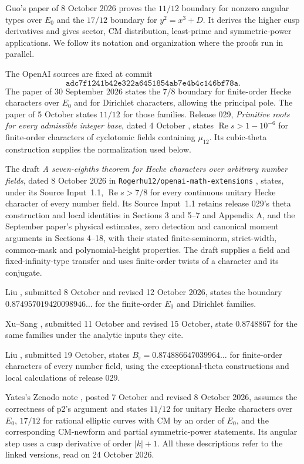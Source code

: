 \documentclass[11pt,a4paper]{article}
\numberwithin{equation}{section}
\theoremstyle{definition}
\theoremstyle{remark}
\newcommand{\Rea}{\operatorname{Re}}
\begin{document}
Guo's paper of 8 October 2026 \cite{GuoEisenstein} proves the $11/12$ boundary for nonzero angular types over $E_0$ and the $17/12$ boundary for $y^2=x^3+D$. It derives the higher cusp derivatives and gives sector, CM distribution, least-prime and symmetric-power applications. We follow its notation and organization where the proofs run in parallel.

The OpenAI sources are fixed at commit
\[
 \texttt{adc7f1241b42e322a6451854ab7e4b4c146bf78a}.
\]
The paper of 30 September 2026 \cite[Theorem 1.1]{QRH78} states the $7/8$ boundary for finite-order Hecke characters over $E_0$ and for Dirichlet characters, allowing the principal pole. The paper of 5 October \cite[Theorem 1.1]{QRH12} states $11/12$ for those families. Release 029, \emph{Primitive roots for every admissible integer base}, dated 4 October \cite[Theorem 1.2]{PrimitiveRoots}, states $\Rea s>1-10^{-6}$ for finite-order characters of cyclotomic fields containing $\mu_{12}$. Its cubic-theta construction supplies the normalization used below.

The draft \emph{A seven-eighths theorem for Hecke characters over arbitrary number fields}, dated 8 October 2026 in \nolinkurl{Rogerhu12/openai-math-extensions} \cite{FollowupSevenEighths}, states, under its Source Input~1.1, $\Rea s>7/8$ for every continuous unitary Hecke character of every number field. Its Source Input~1.1 retains release 029's theta construction and local identities in Sections 3 and 5--7 and Appendix A, and the September paper's physical estimates, zero detection and canonical moment arguments in Sections 4--18, with their stated finite-seminorm, strict-width, common-mask and polynomial-height properties. The draft supplies a field and fixed-infinity-type transfer and uses finite-order twists of a character and its conjugate.

Liu \cite{LiuImproved}, submitted 8 October and revised 12 October 2026, states the boundary $0.874957019420098946\ldots$ for the finite-order $E_0$ and Dirichlet families.

Xu--Sang \cite{XuSang}, submitted 11 October and revised 15 October, state $0.8748867$ for the same families under the analytic inputs they cite.

Liu \cite{LiuFields}, submitted 19 October, states $B_\flat=0.874886647039964\ldots$ for finite-order characters of every number field, using the exceptional-theta constructions and local calculations of release 029.

Yates's Zenodo note \cite{Yates}, posted 7 October and revised 8 October 2026, assumes the correctness of p2's argument and states $11/12$ for unitary Hecke characters over $E_0$, $17/12$ for rational elliptic curves with CM by an order of $E_0$, and the corresponding CM-newform and partial symmetric-power statements. Its angular step uses a cusp derivative of order $|k|+1$. All these descriptions refer to the linked versions, read on 24 October 2026.
\end{document}
